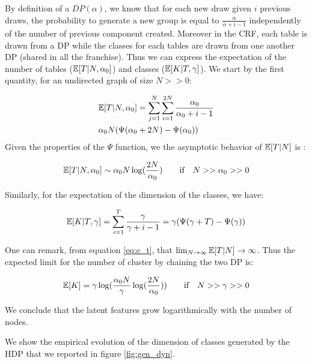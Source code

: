 By definition of a \(DP(\alpha)\), we know that for each new draw given
\(i\) previous draws, the probability to generate a new group is equal
to \(\frac{\alpha}{\alpha +i-1}\) independently of the number of previous
component created. Moreover in the CRF, each table is drawn from a DP while the classes for each tables are drawn from one another DP (shared in all the franchise). Thus we can express the expectation of the number of tables ($\mathbb{E}[T|N, \alpha_0]$) and classes ($\mathbb{E}[K|T, \gamma]$). We start by the first quantity, for an undirected graph of size $N >> 0$:

\begin{align*}
&\mathbb{E}[T|N, \alpha_0] = \sum_{j=1}^N\sum_{i=1}^{2N} \frac{\alpha_0}{\alpha_0 +i-1} \\
& \alpha_0 N (\Psi(\alpha_0+2N) - \Psi(\alpha_0))
\end{align*}
Given the properties of the $\Psi$ function, we the asymptotic behavior of $\mathbb{E}[T|N]$ is :

\begin{equation*} \label{eq:e_t}
\E[T|N, \alpha_0] \sim \alpha_0 N \log(\frac{2N}{\alpha_0}) \qquad \text{if} \quad N >> \alpha_0 >> 0
\end{equation*}

Similarly, for the expectation of the dimension of the classes, we have:

\begin{equation*}
\mathbb{E}[K|T, \gamma] = \sum_{i=1}^{T} \frac{\gamma}{\gamma +i-1} = \gamma (\Psi(\gamma+T) - \Psi(\gamma))
\end{equation*}

One can remark, from equation \eqref{eq:e_t}, that $\lim_{N\to\infty} \mathbb{E}[T|N] \to  \infty$. Thus the expected limit for the number of cluster by chaining the two DP is:

\begin{equation*}
\mathbb{E}[K] = \gamma \log(\frac{\alpha_0 N}{\gamma}\log(\frac{2N}{\alpha_0} )) \qquad \textnormal{if} \quad N >> \gamma>>0
\end{equation*}

We conclude that the latent features grow logarithmically with the number of nodes.

We show the empirical evolution of the dimension of classes generated by the HDP that we reported in figure \ref{fig:gen_dyn}. 


